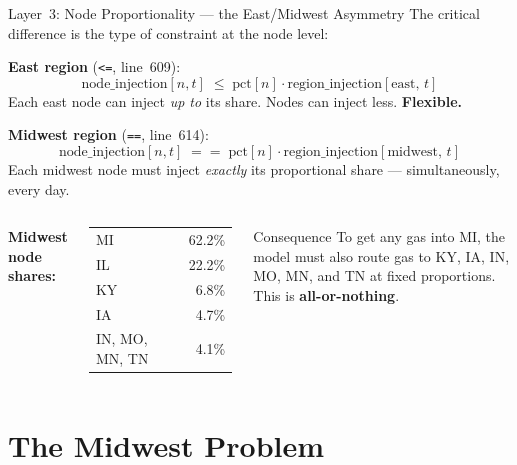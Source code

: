 \documentclass[aspectratio=169, 11pt]{beamer}
\begin{document}
\begin{frame}{Layer~3: Node Proportionality --- the East/Midwest Asymmetry}
  The critical difference is the type of constraint at the node level:

  \vspace{0.3em}
  \textbf{East region} (\texttt{<=}, line~609):
  \[
    \text{node\_injection}[n,t] \;\leq\; \text{pct}[n] \cdot \text{region\_injection}[\text{east},\,t]
  \]
  Each east node can inject \emph{up to} its share. Nodes can inject less. \textbf{Flexible.}

  \vspace{0.5em}
  \textbf{Midwest region} (\texttt{==}, line~614):
  \[
    \text{node\_injection}[n,t] \;==\; \text{pct}[n] \cdot \text{region\_injection}[\text{midwest},\,t]
  \]
  Each midwest node must inject \emph{exactly} its proportional share --- simultaneously, every day.

  \vspace{0.3em}
  \begin{columns}[T]
      \textbf{Midwest node shares:}\\[0.3em]
      \small
      \begin{tabular}{lr}
        MI & 62.2\% \\
        IL & 22.2\% \\
        KY &  6.8\% \\
        IA &  4.7\% \\
        IN, MO, MN, TN & 4.1\% \\
      \end{tabular}

      \begin{alertblock}{Consequence}
        To get any gas into MI, the model must also route gas to KY, IA, IN, MO, MN, and TN at fixed proportions. This is \textbf{all-or-nothing}.
      \end{alertblock}
  \end{columns}
\end{frame}


\section{The Midwest Problem}
\end{document}
